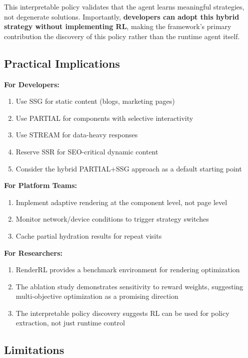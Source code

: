 \documentclass[10pt,twocolumn]{article}
\newcommand{\method}{RenderRL}
\begin{document}
This interpretable policy validates that the agent learns meaningful strategies, not degenerate solutions. Importantly, \textbf{developers can adopt this hybrid strategy without implementing RL}, making the framework's primary contribution the discovery of this policy rather than the runtime agent itself.

\subsection{Practical Implications}

\textbf{For Developers:}
\begin{enumerate}[nosep]
\item Use SSG for static content (blogs, marketing pages)
\item Use PARTIAL for components with selective interactivity
\item Use STREAM for data-heavy responses
\item Reserve SSR for SEO-critical dynamic content
\item Consider the hybrid PARTIAL+SSG approach as a default starting point
\end{enumerate}

\textbf{For Platform Teams:}
\begin{enumerate}[nosep]
\item Implement adaptive rendering at the component level, not page level
\item Monitor network/device conditions to trigger strategy switches
\item Cache partial hydration results for repeat visits
\end{enumerate}

\textbf{For Researchers:}
\begin{enumerate}[nosep]
\item \method{} provides a benchmark environment for rendering optimization
\item The ablation study demonstrates sensitivity to reward weights, suggesting multi-objective optimization as a promising direction
\item The interpretable policy discovery suggests RL can be used for policy extraction, not just runtime control
\end{enumerate}

\subsection{Limitations}
\end{document}
